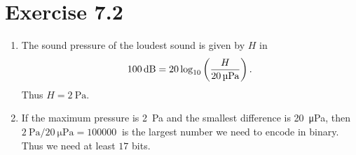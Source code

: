 \documentclass{abrice}
\begin{document}
\section{Exercise 7.2}

\begin{enumerate}[label= (\alph*)]
\item The sound pressure of the loudest sound is given by $H$ in
  \begin{equation*}
    \SI{100}{\decibel} = 20 \log_{10}\left( {H \over \SI{20}{\micro\pascal}}
    \right).
  \end{equation*}
  Thus $H = \SI{2}{\pascal}$.
\item If the maximum pressure is \SI{2}{\pascal} and the smallest difference is
  \SI{20}{\micro\pascal}, then $\SI{2}{\pascal} / \SI{20}{\micro\pascal} =
  \SI{100000}{}$ is the largest number we need to encode in binary. Thus we need
  at least $17$ bits.
\end{enumerate}
\end{document}
